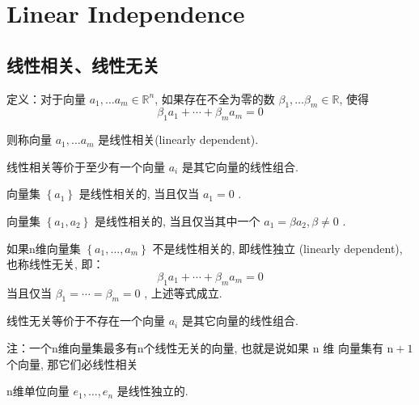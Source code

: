 \chapter{Linear Independence}

\section{线性相关、线性无关}

\begin{definition}
    定义：对于向量 $ a_{1}, \ldots a_{m} \in \mathbb{R}^{n} $, 如果存在不全为零的数 $ \beta_{1}, \ldots \beta_{m} \in \mathbb{R} $, 使得
$$
\beta_{1} a_{1}+\cdots+\beta_{m} a_{m}=0
$$

则称向量 $ a_{1}, \ldots a_{m} $ 是线性相关(linearly dependent). 
\end{definition}

线性相关等价于至少有一个向量 $ a_{i} $ 是其它向量的线性组合. 

\begin{corollary}
    向量集 $ \left\{a_{1}\right\} $ 是线性相关的, 当且仅当 $ a_{1}=0 $ . 
\end{corollary}
\begin{corollary}
    向量集 $ \left\{a_{1}, a_{2}\right\} $ 是线性相关的,  当且仅当其中一个 $ a_{1}=\beta a_{2}, \beta \neq 0 $ . 
\end{corollary}

\begin{definition}
    \label{Def:LinearIndependence}
    如果n维向量集 $ \left\{a_{1}, \ldots, a_{m}\right\} $ 不是线性相关的, 即线性独立 (linearly dependent), 也称线性无关,  即：
$$
\beta_{1} a_{1}+\cdots+\beta_{m} a_{m}=0
$$
当且仅当 $ \beta_{1}=\cdots=\beta_{m}=0 $ , 上述等式成立. 
\end{definition}

线性无关等价于不存在一个向量 $ a_{i} $ 是其它向量的线性组合. 

\begin{corollary}
    注：一个n维向量集最多有n个线性无关的向量, 也就是说如果 $ \mathrm{n} $ 维 向量集有 $ \mathrm{n}+1 $ 个向量, 那它们必线性相关
\end{corollary}

\begin{example}
    n维单位向量 $ e_{1}, \ldots, e_{n} $ 是线性独立的. 
\end{example}

